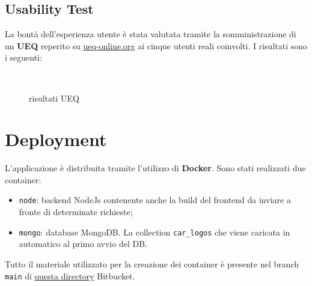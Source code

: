 \documentclass{report}
\begin{document}
\subsection{Usability Test}
La bontà dell'esperienza utente è stata valutata tramite la somministrazione di un \textbf{UEQ} reperito su \href{https://www.ueq-online.org}{ueq-online.org} ai cinque utenti reali coinvolti. I risultati sono i seguenti:
\begin{figure}[H]
    \centering
    \\
    \vspace{.5cm}
  \caption{risultati UEQ}
\end{figure}


\newpage
\section{Deployment}
L'applicazione è distribuita tramite l'utilizzo di \textbf{Docker}. Sono stati realizzati due container:
\begin{itemize}
    \item \texttt{node}: backend NodeJs contenente anche la build del frontend da inviare a fronte di determinate richieste;
    \item \texttt{mongo}: database MongoDB. La collection \texttt{car\_logos} che viene caricata in automatico al primo avvio del DB.
\end{itemize}
Tutto il materiale utilizzato per la creazione dei container è presente nel branch \texttt{main} di \href{https://bitbucket.org/davprs/anti-theft-system-for-vehicle/src/main/}{questa directory} Bitbucket.
\end{document}
